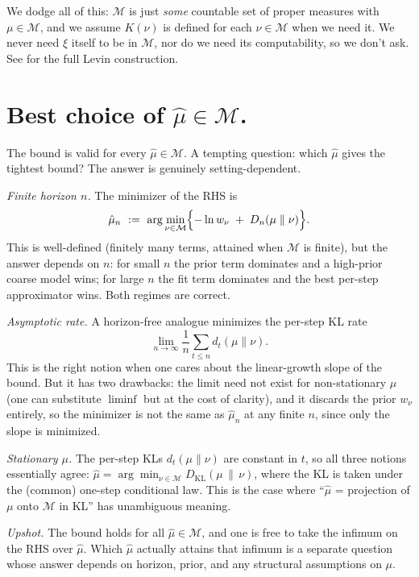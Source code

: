 \documentclass[fontsize=11pt, parskip=half]{scrartcl}
\newcommand{\Mc}{\mathcal{M}}
\begin{document}
We dodge all of this: $\Mc$ is just \emph{some} countable set of proper measures with $\mu \in \Mc$, and we assume $K(\nu)$ is defined for each $\nu \in \Mc$ when we need it. We never need $\xi$ itself to be in $\Mc$, nor do we need its computability, so we don't ask. See \cite[\S2.4.3]{Hutter:04uaibook} for the full Levin construction.


\section{Best choice of $\hat{\mu} \in \Mc$.}\label{app:best_choice_mu}

The bound is valid for every $\hat\mu \in \Mc$. A tempting question: which
$\hat\mu$ gives the tightest bound? The answer is genuinely setting-dependent.

\textit{Finite horizon $n$.} The minimizer of the RHS is
\[
    \hat\mu_n ~:=~ \arg\min_{\nu \in \Mc}\Bigl\{ -\ln w_\nu \;+\; D_n(\mu \parallel \nu) \Bigr\}.
\]
This is well-defined (finitely many terms, attained when $\Mc$ is finite),
but the answer depends on $n$: for small $n$ the prior term dominates and a
high-prior coarse model wins; for large $n$ the fit term dominates and the best
per-step approximator wins. Both regimes are correct.

\textit{Asymptotic rate.} A horizon-free analogue minimizes the per-step KL
rate $$\lim_{n \to \infty} \frac{1}{n} \sum_{t \leq n} d_t(\mu \parallel \nu).$$ This is the right notion when one cares about the linear-growth slope of the bound. But it has two drawbacks: the limit need not exist for non-stationary $\mu$ (one can substitute $\liminf$ but at the cost of clarity), and it discards the prior $w_\nu$ entirely, so the minimizer is not the same as $\hat\mu_n$ at any finite $n$, since only the slope is minimized.

\textit{Stationary $\mu$.} The per-step KLs $d_t(\mu \parallel \nu)$ are constant in $t$, so all three notions essentially agree: $\hat\mu = \arg\min_{\nu \in \Mc} D_{\text{KL}}(\mu \,\|\, \nu)$, where the KL is taken under the (common) one-step conditional law. This is the case where ``$\hat\mu$ = projection of $\mu$ onto $\Mc$ in KL'' has unambiguous meaning.

\textit{Upshot.} The bound holds for all $\hat\mu \in \Mc$, and one is free
to take the infimum on the RHS over $\hat\mu$. Which $\hat\mu$ actually
attains that infimum is a separate question whose answer depends on horizon,
prior, and any structural assumptions on $\mu$.



\end{document}
